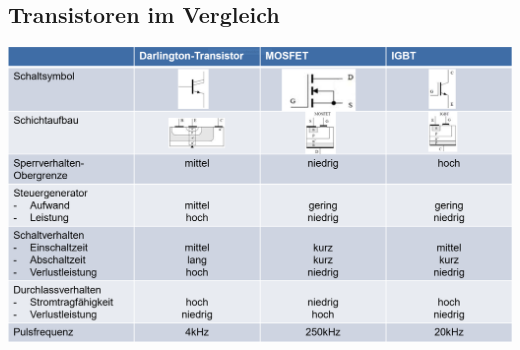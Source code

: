\subsection{Transistoren im Vergleich}
\includegraphics[width=\linewidth]{images/transdiff}
%    
%    

